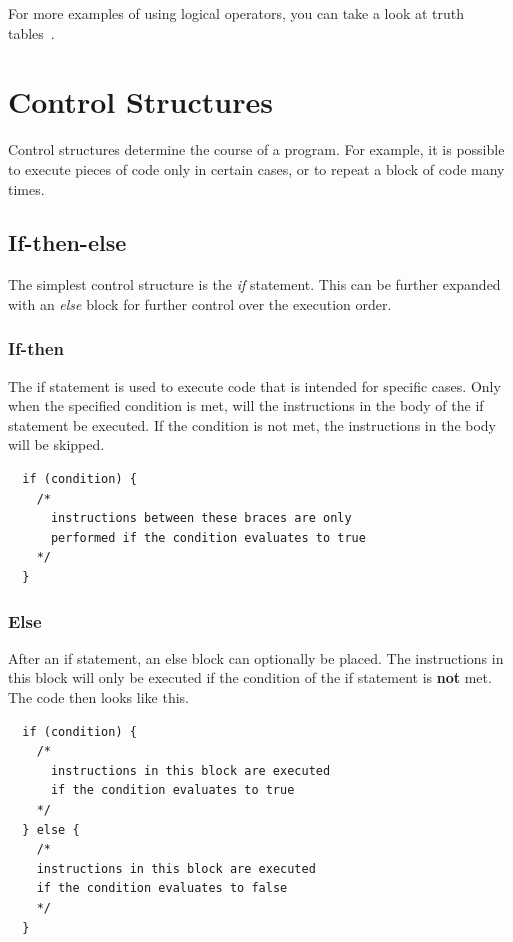 \documentclass[11pt,fleqn]{book} %
\begin{document}
\noindent For more examples of using logical operators, you can take a look at truth tables~\cite{wiki:Truth table}.


\chapter{Control Structures}
Control structures determine the course of a program. For example, it is possible to execute pieces of code only in certain cases, or to repeat a block of code many times.
\section{If-then-else}
The simplest control structure is the \emph{if} statement. This can be further expanded with an \emph{else} block for further control over the execution order.

\subsection{If-then}
The if statement is used to execute code that is intended for specific cases. Only when the specified condition is met, will the instructions in the body of the if statement be executed. If the condition is not met, the instructions in the body will be skipped.\\

\begin{definition}[If]
	\phantom{ }
	\begin{verbatim}
  if (condition) {
    /*
      instructions between these braces are only
      performed if the condition evaluates to true
    */
  }
	\end{verbatim}
	\vspace{0cm}
\end{definition}

\pagebreak

\subsection{Else}
After an if statement, an else block can optionally be placed. The instructions in this block will only be executed if the condition of the if statement is \textbf{not} met. The code then looks like this.\\

\begin{definition}
	\phantom{ }
	\begin{verbatim}
  if (condition) {
    /*
      instructions in this block are executed
      if the condition evaluates to true
    */
  } else {
    /*
    instructions in this block are executed
    if the condition evaluates to false
    */
  }
	\end{verbatim}
\end{definition}
\end{document}
